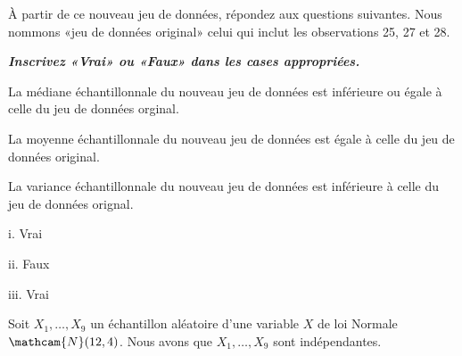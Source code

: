 \begin{questions}
\begin{parts}
À partir de ce nouveau jeu de données, répondez aux questions suivantes. Nous nommons «jeu de données original» celui qui inclut les observations 25, 27 et 28.

\textbf{\textit{Inscrivez «Vrai» ou «Faux» dans les cases appropriées.}}

\begin{subparts}
\subpart[1]La médiane échantillonnale du nouveau jeu de données est inférieure ou égale à celle du jeu de données orginal.

\vfrep{}

\subpart[1] La moyenne échantillonnale du nouveau jeu de données est égale à celle du jeu de données original.

\vfrep{}

\subpart[1] La variance échantillonnale du nouveau jeu de données est inférieure à celle du jeu de données orignal.

\vfrep{}

\begin{solution}
    
    i. Vrai

    ii. Faux

    iii. Vrai
\end{solution}
   

\end{subparts}
\end{parts}


\newpage


\question\label{estimateursPonctuels} 

Soit $X_1, \dots, X_9$ un échantillon aléatoire d'une variable $X$ de loi Normale $\mathcam{N}(12, 4)$. Nous avons que $X_1, \dots, X_9$ sont indépendantes. 

\end{questions}
